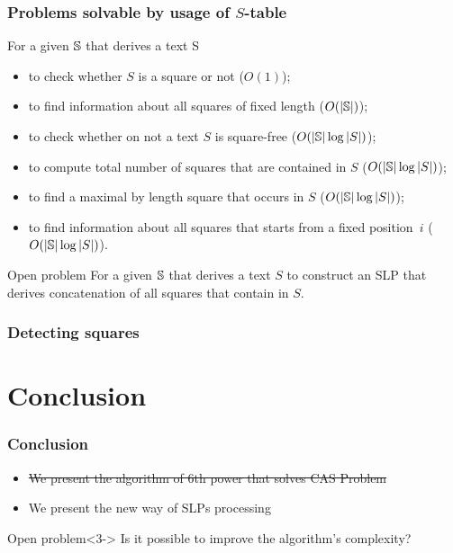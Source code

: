 \documentclass{beamer}
\begin{document}
\begin{frame}
\frametitle{Problems solvable by usage of $S$-table}

For a given $\mathbb{S}$ that derives a text S
\begin{itemize}
  \item to check whether $S$ is a square or not ($O(1)$);
  \pause
  \item to find information about all squares of fixed length ($O(|\mathbb{S}|)$);
  \pause
  \item to check whether on not a text $S$ is square-free ($O(|\mathbb{S}| \log |S|)$);
  \pause
  \item to compute total number of squares that are contained in $S$ ($O(|\mathbb{S}| \log |S|)$);
  \pause
  \item to find a maximal by length square that occurs in $S$ ($O(|\mathbb{S}| \log |S|)$);
  \pause
  \item to find information about all squares that starts from a fixed position~$i$ ($O(|\mathbb{S}| \log |S|)$).
\end{itemize}

\pause

\begin{alertblock}{Open problem}
For a given $\mathbb{S}$ that derives a text $S$ to construct an SLP that derives concatenation of all squares that contain in $S$.
\end{alertblock}

\end{frame}

\begin{frame}
\frametitle{Detecting squares}

\begin{center}
    \squaresDetecting
\end{center}
\end{frame}

\section*{Conclusion}

\begin{frame}
\frametitle{Conclusion}

\begin{itemize}
  \item<1-> \sout{We present the algorithm of 6th power that solves CAS Problem}
  \item<2-> We present the new way of SLPs processing
\end{itemize}

\pause

\begin{alertblock}{Open problem}<3->
Is it possible to improve the algorithm's complexity? 
\end{alertblock}
\end{frame}
\end{document}
